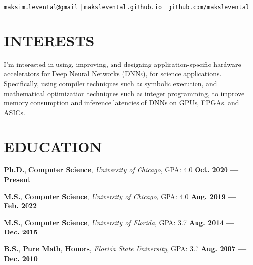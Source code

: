 \documentclass[11pt,letterpaper,roman,colorlinks,linkcolor=blue]{moderncv}
\newcommand*{\modern}{\fontfamily{qhv}\selectfont}
\newcommand{\mystyle}[1]{\textcolor{mygrey}{\modern #1}}
\newcommand{\mysectionstyle}[1]{\large\mystyle{#1}}
\begin{document}
\makecvtitle

\vspace{-16mm}
\begin{center}
\mystyle{\href{maksim.levental@gmail.com}{\texttt{maksim.levental@gmail}} $|$ \href{https://makslevental.github.io/}{\texttt{makslevental.github.io}} $|$ \href{https://github.com/makslevental}{\texttt{github.com/makslevental}}}
\end{center}


\section{\mysectionstyle{INTERESTS}}

I'm interested in using, improving, and designing application-specific hardware accelerators for Deep Neural Networks (DNNs), for science applications. 
Specifically, using compiler techniques such as symbolic execution, and mathematical optimization techniques such as integer programming, to improve memory consumption and inference latencies of DNNs on GPUs, FPGAs, and ASICs. 


\section{\mysectionstyle{EDUCATION}}

\textbf{Ph.D.}, \textbf{Computer Science}, \emph{University of Chicago}, GPA: 4.0
\hfill \textbf{Oct. 2020 --- Present}

\textbf{M.S.}, \textbf{Computer Science}, \emph{University of Chicago}, GPA: 4.0
\hfill \textbf{Aug. 2019 --- Feb. 2022}

\textbf{M.S.}, \textbf{Computer Science}, \emph{University of Florida}, GPA: 3.7
\hfill \textbf{Aug. 2014 --- Dec. 2015}

\textbf{B.S.}, \textbf{Pure Math}, \textbf{Honors}, \emph{Florida State University}, GPA: 3.7
\hfill \textbf{Aug. 2007 --- Dec. 2010}

\end{document}
